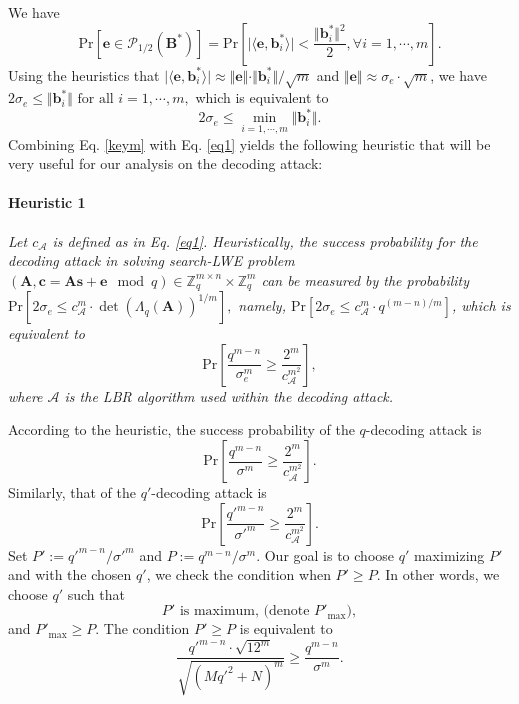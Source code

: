 \documentclass{cta-author}
\begin{document}
We have $$\mathrm{Pr}\left[ \mathbf{e} \in \mathcal{P}_{1/2}(\mathbf{B^*})\right]=\mathrm{Pr}\left[\vert \langle \mathbf{e}, \mathbf{b}_i^{*} \rangle \vert < \frac{\Vert \mathbf{b}_i^{*} \Vert^2}{2}, \forall i=1,\cdots,m\right].$$ 
Using the heuristics that
$\vert \langle \mathbf{e}, \mathbf{b}_i^{*} \rangle \vert  \approx \Vert \mathbf{e} \Vert \cdot \Vert \mathbf{b}_i^{*} \Vert /\sqrt{m}$ and  $\Vert \mathbf{e} \Vert \approx \sigma_e \cdot \sqrt{m}$, we have  $2 \sigma_e \leq \Vert \mathbf{b}_i^{*} \Vert \text{ for all } i=1,\cdots,m,$ which is equivalent to 
\begin{equation}\label{keym}
2 \sigma_e \leq \min_{i=1,\cdots,m}\Vert \mathbf{b}_i^* \Vert.
\end{equation}
Combining Eq. \eqref{keym} with Eq. \eqref{eq1} yields the following heuristic that will be very useful for our analysis on the decoding attack:
\paragraph{Heuristic 1} 
\textit{Let $c_{\mathcal{A}}$ is defined as in Eq. \eqref{eq1}. Heuristically, the success probability for the decoding attack in solving search-LWE problem $(\mathbf{A}, \mathbf{c}=\mathbf{A}\mathbf{s}+\mathbf{e} \mod q) \in \mathbb{Z}_q^{m \times n} \times \mathbb{Z}_q^m$ can be measured by the probability
	$\mathrm{Pr}\left[2\sigma_e \leq c_{\mathcal{A}}^m \cdot \det(\Lambda_q{(\mathbf{A})})^{1/m}\right],$
	namely,
	$\mathrm{Pr}\left[2\sigma_e \leq c_{\mathcal{A}}^m \cdot q^{(m-n)/m}\right]$,
	which is equivalent to
	\begin{equation*}\label{eqa}
	\mathrm{Pr} \left[\frac{q^{m-n}}{\sigma_e^m} \geq  \frac{2^m}{c_{\mathcal{A}}^{m^2}}\right],
	\end{equation*}
	where $\mathcal{A}$ is the LBR algorithm used within the decoding attack.}



According to the heuristic, the success probability of the $q$-decoding attack is
\begin{equation*}\label{keyw}
\mathrm{Pr} \left[\frac{q^{m-n}}{\sigma^m} \geq  \frac{2^m}{c_{\mathcal{A}}^{m^2}}\right].
\end{equation*}
Similarly, that of the $q'$-decoding attack is
\begin{equation*}\label{keya}
\mathrm{Pr} \left[\frac{q'^{m-n}}{\sigma'^m} \geq  \frac{2^m}{c_{\mathcal{A}}^{m^2}}\right].
\end{equation*}
Set $P':=q'^{m-n}/ \sigma'^m $ and $ P:= q^{m-n}/ \sigma^m$. Our goal is to choose $q'$ maximizing $P'$ and with the chosen $q'$, we check the condition when $P' \geq P$. In other words, we choose $q'$ such that
\begin{equation*}\label{eqn}
P' \text{ is maximum, (denote } P'_{\text{max}}),
\end{equation*} 
and $P'_{\text{max}} \geq P$.
The condition $P' \geq P$ is equivalent to
\begin{equation}\label{eqk1}
\frac{q'^{m-n}\cdot \sqrt{12^m}}{\sqrt{(Mq'^2+N)^m}} \geq \frac{q^{m-n}}{\sigma^m}.
\end{equation}
\end{document}
